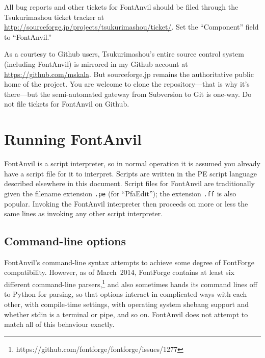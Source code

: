 \documentclass[11pt]{report}
\begin{document}
All bug reports and other tickets for FontAnvil should be filed through
the Tsukurimashou ticket tracker at
\url{http://sourceforge.jp/projects/tsukurimashou/ticket/}.  Set the
``Component'' field to ``FontAnvil.''

As a courtesy to Github users, Tsukurimashou's entire source control system
(including FontAnvil) is mirrored in my Github account at
\url{https://github.com/mskala}.  But sourceforge.jp remains the
authoritative public home of the project.  You are welcome to clone the
repository---that is why it's there---but the semi-automated gateway from
Subversion to Git is one-way.  Do not file tickets for FontAnvil on Github.

\clearpage


\chapter{Running FontAnvil}

FontAnvil is a script interpreter, so in normal operation it is assumed you
already have a script file for it to interpret.  Scripts are written in the
PE script language described elsewhere in this document.  Script files for
FontAnvil are traditionally given the filename extension \texttt{.pe} (for
``PfaEdit''); the extension \texttt{.ff} is also popular.  Invoking the
FontAnvil interpreter then proceeds on more or less the same lines as
invoking any other script interpreter.

\section{Command-line options}

\begin{framed}
FontAnvil's command-line syntax attempts to achieve some degree of FontForge
compatibility.  However, as of March~2014, FontForge contains at least six
different command-line
parsers,\footnote{https://github.com/fontforge/fontforge/issues/1277} and
also sometimes hands its command lines off to Python for parsing, so that
options interact in complicated ways with each other, with compile-time
settings, with operating system shebang support and whether stdin is a
terminal or pipe, and so on.  FontAnvil does not attempt to match all of
this behaviour exactly.
\end{framed}
\end{document}
